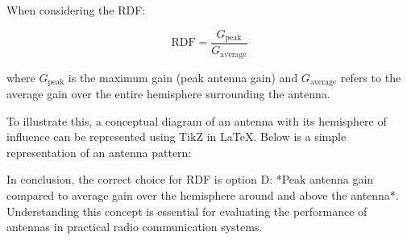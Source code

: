 When considering the RDF:

\[
\text{RDF} = \frac{G_{\text{peak}}}{G_{\text{average}}}
\]

where \(G_{\text{peak}}\) is the maximum gain (peak antenna gain) and \(G_{\text{average}}\) refers to the average gain over the entire hemisphere surrounding the antenna.

To illustrate this, a conceptual diagram of an antenna with its hemisphere of influence can be represented using TikZ in LaTeX. Below is a simple representation of an antenna pattern:


In conclusion, the correct choice for RDF is option D: *Peak antenna gain compared to average gain over the hemisphere around and above the antenna*. Understanding this concept is essential for evaluating the performance of antennas in practical radio communication systems.